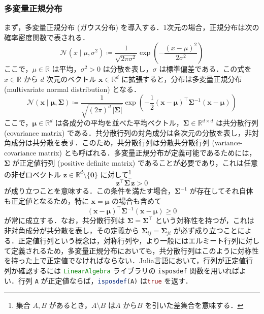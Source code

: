 \documentclass[titlepage]{ltjsbook}
\newcommand{\jl}{\lstinline[language=julia]}
\begin{document}
\subsubsection{多変量正規分布}
まず，多変量正規分布 (ガウス分布) を導入する．1次元の場合，正規分布は次の確率密度関数で表される．
\begin{equation}
\mathcal{N}(x \mid \mu, \sigma^2) 
\coloneq \frac{1}{\sqrt{2\pi \sigma^2}} \exp\left( -\frac{(x-\mu)^2}{2\sigma^2} \right)
\end{equation}
ここで，$\mu \in \mathbb{R}$ は平均，$\sigma^2 > 0$ は分散を表し，$\sigma$ は標準偏差である．この式を $x \in \mathbb{R}$ から $d$ 次元のベクトル $\mathbf{x} \in \mathbb{R}^d$ に拡張すると，分布は多変量正規分布 (multivariate normal distribution) となる．
\begin{equation}
\mathcal{N}(\mathbf{x} \mid \boldsymbol{\mu}, \boldsymbol{\Sigma}) 
\coloneq \frac{1}{\sqrt{(2\pi)^d \, |\boldsymbol{\Sigma}|}}
\exp\left( -\frac{1}{2} (\mathbf{x} - \boldsymbol{\mu})^\top \boldsymbol{\Sigma}^{-1} (\mathbf{x} - \boldsymbol{\mu}) \right)
\end{equation}
ここで，$\boldsymbol{\mu} \in \mathbb{R}^d$ は各成分の平均を並べた平均ベクトル，$\boldsymbol{\Sigma} \in \mathbb{R}^{d \times d}$ は共分散行列 (covariance matrix) である．共分散行列の対角成分は各次元の分散を表し，非対角成分は共分散を表す．このため，共分散行列は分散共分散行列 (variance-covariance matrix) とも呼ばれる．多変量正規分布が定義可能であるためには，$\boldsymbol{\Sigma}$ が正定値行列 (positive definite matrix) であることが必要であり，これは任意の非ゼロベクトル $\mathbf{z} \in \mathbb{R}^d \setminus \{\mathbf{0}\}$ に対して\footnote{集合 $A, B$ があるとき，$A \setminus B$ は$A$ から$B$ を引いた差集合を意味する．}
\begin{equation}
\mathbf{z}^\top \boldsymbol{\Sigma} \, \mathbf{z} > 0
\end{equation}
が成り立つことを意味する．この条件を満たす場合，$\boldsymbol{\Sigma}^{-1}$ が存在してそれ自体も正定値となるため，特に $\mathbf{x} = \boldsymbol{\mu}$ の場合も含めて
\begin{equation}
(\mathbf{x} - \boldsymbol{\mu})^\top \boldsymbol{\Sigma}^{-1} (\mathbf{x} - \boldsymbol{\mu}) \geq 0
\end{equation}
が常に成立する．なお，共分散行列は $\boldsymbol{\Sigma} = \boldsymbol{\Sigma}^\top$ という対称性を持つが，これは非対角成分が共分散を表し，その定義から $\boldsymbol{\Sigma}_{ij} = \boldsymbol{\Sigma}_{ji}$ が必ず成り立つことによる．正定値行列という概念は，対称行列や，より一般にはエルミート行列に対して定義されるため，多変量正規分布においても，共分散行列はこのように対称性を持った上で正定値でなければならない．Julia言語において，行列が正定値行列か確認するには \jl{LinearAlgebra} ライブラリの \jl{isposdef} 関数を用いればよい．行列 \jl{A} が正定値ならば，\jl{isposdef(A)} は\jl{true} を返す．
\end{document}
